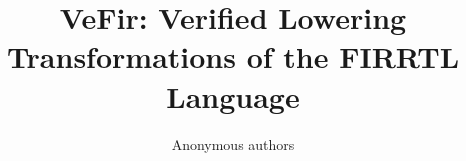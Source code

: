 \documentclass[acmsmall,review,anonymous]{acmart}%
\newcommand{\tool}{\textsf{VeFir}}
\begin{document}

\title{\tool: Verified Lowering Transformations of the FIRRTL Language}




\author{Anonymous authors}
\end{document}
